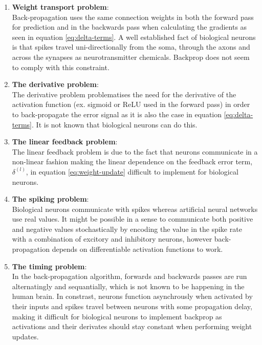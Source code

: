\documentclass[a4paper,11pt]{article} %
\begin{document}
\begin{enumerate}
  \item \textbf{Weight transport problem}: \vspace{5pt} \\
  Back-propagation uses the same connection weights in both the forward pass for prediction and in the backwards pass when calculating the gradients as seen in equation \ref{eq:delta-terms}. A well established fact of biological neurons is that spikes travel uni-directionally from the soma, through the axons and across the synapses as neurotransmitter chemicals. Backprop does not seem to comply with this constraint. 
  \item \textbf{The derivative problem}: \vspace{5pt} \\
  The derivative problem problematises the need for the derivative of the activation function (ex. sigmoid or ReLU used in the forward pass) in order to back-propagate the error signal as it is also the case in equation \ref{eq:delta-terms}. It is not known that biological neurons can do this.
  \item \textbf{The linear feedback problem}: \vspace{5pt} \\
  The linear feedback problem is due to the fact that neurons communicate in a non-linear fashion making the linear dependence on the feedback error term, $\delta^{(l)}$, in equation \ref{eq:weight-update} difficult to implement for biological neurons. 
  \item \textbf{The spiking problem}: \vspace{5pt} \\
  Biological neurons communicate with spikes whereas artificial neural networks use real values. It might be possible in a sense to communicate both positive and negative values stochastically by encoding the value in the spike rate with a combination of excitory and inhibitory neurons, however back-propagation depends on differentiable activation functions to work. %
  \item \textbf{The timing problem}: \vspace{5pt} \\
  In the back-propagation algorithm, forwards and backwards passes are run alternatingly and sequantially, which is not known to be happening in the human brain. In constrast, neurons function asynchrously when activated by their inputs and spikes travel between neurons with some propagation delay, making it difficult for biological neurons to implement backprop as activations and their derivates should stay constant when performing weight updates. 

\end{enumerate}
\end{document}

